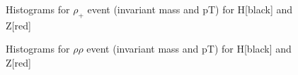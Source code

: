 \documentclass[10pt]{article}
\begin{document}
\begin{figure}[h] \centering
{}
\caption{Histograms for $\rho _+$ event (invariant mass and pT) for H[black] and Z[red]}
\end{figure}
\begin{figure}[h] \centering
{}
\caption{Histograms for $\rho \rho$ event (invariant mass and pT) for H[black] and Z[red]}
\end{figure}
\end{document}
